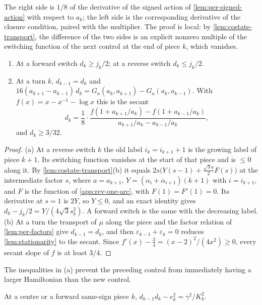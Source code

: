 The right side is $1/8$ of the derivative of the signed action of \cref{lem:per-signed-action}
with respect to $a_k$; the left side is the corresponding derivative of the closure condition,
paired with the multiplier. The proof is local: by \cref{lem:costate-transport}, the
difference of the two sides is an explicit nonzero multiple of the switching function of the
next control at the end of piece $k$, which vanishes.

\begin{lemma}\label{lem:switch-norms}
\begin{enumerate}[label=\textup{(\alph*)}]
\item At a forward switch $d_k\ge j_k/2$; at a reverse switch $d_k\le j_k/2$.
\item At a turn $k$, $d_{k-1}=d_k$ and $16(a_{k+1}-a_{k-1})\,d_k=G_a(a_k,a_{k+1})-G_a(a_k,a_{k-1})$.
  With $f(x)=x-x^{-1}-\log x$ this is the secant
  \[
    d_k=\frac18\cdot\frac{f(1+a_{k+1}/a_k)-f(1+a_{k-1}/a_k)}{a_{k+1}/a_k-a_{k-1}/a_k},
  \]
  and $d_k\ge3/32$.
\end{enumerate}
\end{lemma}

\begin{proof}
(a) At a reverse switch $k$ the old label $i_k=i_{k+1}+1$ is the growing label of piece $k+1$.
Its switching function vanishes at the start of that piece and is $\le0$ along it. By
\cref{lem:costate-transport}(b) it equals $2s\bigl(Y(s-1)+\frac{\sqrt3a}{2}F(s)\bigr)$ at the
intermediate factor $s$, where $a=a_{k+1}$, $Y=(\alpha_i+\alpha_{i+1})(k+1)$ with $i=i_{k+1}$,
and $F$ is the function of \cref{app:rev-one-arc}, with $F(1)=F'(1)=0$. Its derivative at $s=1$ is
$2Y$, so $Y\le0$, and an exact identity gives
$d_k-j_k/2=Y/(4\sqrt3s_k^2)$. A forward switch is the same
with the decreasing label. (b) At a turn the transport of $\mu$ along the
piece and the factor relation of \cref{lem:per-factors} give $d_{k-1}=d_k$, and then $\varepsilon_{k-1}+\varepsilon_k=0$ reduces \cref{lem:stationarity}
to the secant. Since $f'(x)-\frac34=(x-2)^2/(4x^2)\ge0$, every secant slope of $f$ is at least
$3/4$.
\end{proof}

The inequalities in (a) prevent the preceding control from immediately having a larger Hamiltonian
than the new control.

\begin{lemma}\label{lem:gram}
At a centre or a forward same-sign piece $k$, $d_{k-1}d_k-e_k^2=\gamma^2/K_k^2$.
\end{lemma}

